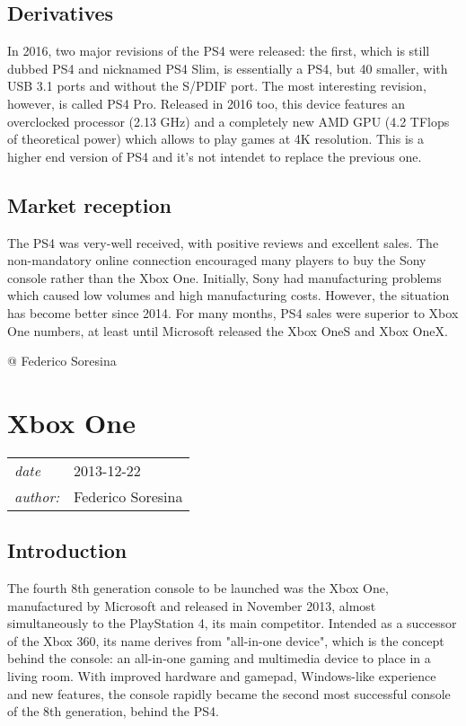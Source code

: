 \documentclass[a4paper,10pt]{book}
\newcommand{\pageHeader}[4]{
    \section{#1}
    \vspace{-0.3cm}
    \begin{table}[h!]
     \begin{tabular}{ll}
        \hline
        \textit{date} & #2 \\
        \textit{author: } & #3\\
        \hline
     \end{tabular}
    \end{table}
    \vspace{-0.3cm}
}
\begin{document}
 \subsection{ Derivatives  }
  In 2016, two major revisions of the PS4 were released: the first, which is still dubbed PS4 and nicknamed PS4 Slim, is essentially a PS4, but 40 smaller, with USB 3.1 ports and without the S/PDIF port.  
  The most interesting revision, however, is called PS4 Pro. Released in 2016 too, this device features an overclocked processor (2.13 GHz) and a completely new AMD GPU (4.2 TFlops of theoretical power) which allows to play games at 4K resolution. This is a higher end version of PS4 and it's not intendet to replace the previous one.  
 \subsection{ Market reception  }
  The PS4 was very-well received, with positive reviews and excellent sales. The non-mandatory online connection encouraged many players to buy the Sony console rather than the Xbox One.  
  Initially, Sony had manufacturing problems which caused low volumes and high manufacturing costs. However, the situation has become better since 2014. For many months, PS4 sales were superior to Xbox One numbers, at least until Microsoft released the Xbox OneS and Xbox OneX.  
 
 @ Federico Soresina 
 
 \newpage\pageHeader{Xbox One}{2013-12-22}{Federico Soresina}{Xbox One description page}
 \subsection{ Introduction  }
  The fourth 8th generation console to be launched was the Xbox One, manufactured by Microsoft and released in November 2013, almost simultaneously to the PlayStation 4, its main competitor. Intended as a successor of the Xbox 360, its name derives from "all-in-one device", which is the concept behind the console: an all-in-one gaming and multimedia device to place in a living room. With improved hardware and gamepad, Windows-like experience and new features, the console rapidly became the second most successful console of the 8th generation, behind the PS4.  
\end{document}

